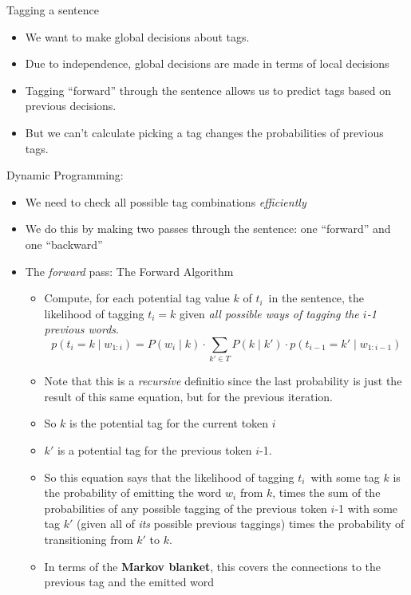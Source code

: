 \documentclass[11pt,letterpaper]{article}
\newcommand{\tcurr}{\ensuremath{t_i}}
\begin{document}
Tagging a sentence

\begin{itemize}
  \item We want to make global decisions about tags.
  \item Due to independence, global decisions are made in terms of local decisions
  \item Tagging ``forward'' through the sentence allows us to predict tags based on previous decisions.
  \item But we can't calculate picking a tag changes the probabilities of previous tags.
\end{itemize}

Dynamic Programming:

\begin{itemize}
  \item We need to check all possible tag combinations \textit{efficiently}
  \item We do this by making two passes through the sentence: one ``forward'' and one ``backward''
  \item The \textit{forward} pass: The Forward Algorithm
    \begin{itemize}
      \item Compute, for each potential tag value $k$ of \tcurr\ in the sentence, the likelihood of tagging $t_i=k$ given \textit{all possible ways of tagging the $i$-1 previous words}.
        \[
          p(t_i=k \mid w_{1:i}) = P(w_i \mid k) \cdot \sum_{k' \in T} P(k \mid k') \cdot p(t_{i-1}=k' \mid w_{1:i-1})
        \]
      \item Note that this is a \textit{recursive} definitio since the last probability is just the result of this same equation, but for the previous iteration.
      \item So $k$ is the potential tag for the current token $i$
      \item $k'$ is a potential tag for the previous token $i$-1.
      \item So this equation says that the likelihood of tagging \tcurr\ with some tag $k$ is the probability of emitting the word $w_i$ from $k$, times the sum of the probabilities of any possible tagging of the previous token $i$-1 with some tag $k'$ (given all of \textit{its} possible previous taggings) times the probability of transitioning from $k'$ to $k$.
      \item In terms of the \textbf{Markov blanket}, this covers the connections to the previous tag and the emitted word
    \end{itemize}

\end{itemize}
\end{document}
